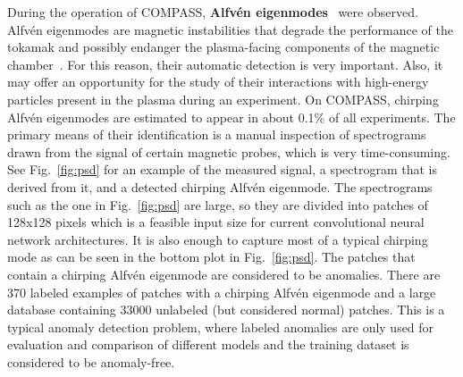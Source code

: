 During the operation of COMPASS, \textbf{Alfv\'en eigenmodes}~\cite{markovic2015alfven, melnikov2015quasicoherent, markovic2017alfven} were observed. Alfv\'en eigenmodes are magnetic instabilities that degrade the performance of the tokamak and possibly endanger the plasma-facing components of the magnetic chamber~\cite{mett1992kinetic}. For this reason, their automatic detection is very important. Also, it may offer an opportunity for the study of their interactions with high-energy particles present in the plasma during an experiment. On COMPASS, chirping Alfv\'en eigenmodes are estimated to appear in about 0.1\% of all experiments. The primary means of their identification is a manual inspection of spectrograms drawn from the signal of certain magnetic probes, which is very time-consuming. See Fig.~\ref{fig:psd} for an example of the measured signal, a spectrogram that is derived from it, and a detected chirping Alfv\'en eigenmode. The spectrograms such as the one in Fig.~\ref{fig:psd} are large, so they are divided into patches of 128x128 pixels which is a feasible input size for current convolutional neural network architectures. It is also enough to capture most of a typical chirping mode as can be seen in the bottom plot in Fig.~\ref{fig:psd}. The patches that contain a chirping Alfv\'en eigenmode are considered to be anomalies. There are 370 labeled examples of patches with a chirping Alfv\'en eigenmode and a large database containing 33000 unlabeled (but considered normal) patches. This is a typical anomaly detection problem, where labeled anomalies are only used for evaluation and comparison of different models and the training dataset is considered to be anomaly-free.


